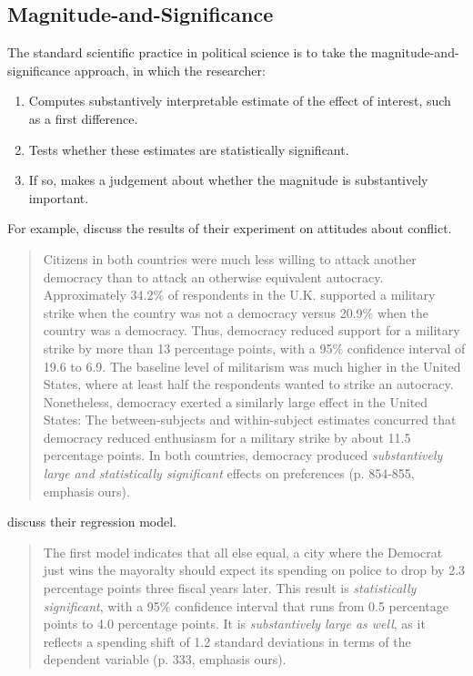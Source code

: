 \documentclass[12pt]{article}
\begin{document}
\subsection*{Magnitude-and-Significance}

The standard scientific practice in political science is to take the magnitude-and-significance approach, in which the researcher: 

\begin{enumerate}
\item Computes substantively interpretable estimate of the effect of interest, such as a first difference.
\item Tests whether these estimates are statistically significant.
\item If so, makes a judgement about whether the magnitude is substantively important.
\end{enumerate}

For example, \cite{TomzWeeks2013} discuss the results of their experiment on attitudes about conflict.

\begin{quote}
Citizens in both countries were much less willing to attack another democracy than to attack an otherwise equivalent autocracy. Approximately 34.2\% of respondents in the U.K. supported a military strike when the country was not a democracy versus 20.9\% when the country was a democracy. Thus, democracy reduced support for a military strike by more than 13 percentage points, with a 95\% confidence interval of 19.6 to 6.9. The baseline level of militarism was much higher in the United States, where at least half the respondents wanted to strike an autocracy. Nonetheless, democracy exerted a similarly large effect in the United States: The between-subjects and within-subject estimates concurred that democracy reduced enthusiasm for a military strike by about 11.5 percentage points. In both countries, democracy produced \emph{substantively large and statistically significant} effects on preferences (p. 854-855, emphasis ours).
\end{quote}

\cite{GerberHopkins2011} discuss their regression model.

\begin{quote}
The first model indicates that all else equal, a city where the Democrat just wins the mayoralty should expect its spending on police to drop by 2.3 percentage points three fiscal years later. This result is \emph{statistically significant}, with a 95\% confidence interval that runs from 0.5 percentage points to 4.0 percentage points. It is \emph{substantively large as well}, as it reflects a spending shift of 1.2 standard deviations in terms of the dependent variable (p. 333, emphasis ours).
\end{quote}
\end{document}
